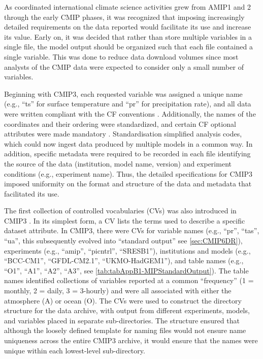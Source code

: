 \documentclass[manuscript]{copernicus}
\def\cred#1{{\color{red}#1}}
\begin{document}
As coordinated international climate science activities grew from AMIP1 and 2 through the early CMIP phases, it was recognized that imposing increasingly detailed requirements on the data reported would facilitate its use and increase its value. Early on, it was decided that rather than store multiple variables in a single file, the model output should be organized such that each file contained a single variable. This was done to reduce data download volumes since most analysts of the CMIP data were expected to consider only a small number of variables.

Beginning with CMIP3, each requested variable was assigned a unique name (e.g., “ts” for surface temperature and “pr” for precipitation rate), and all data were written compliant with the CF conventions \citep[e.g.,][]{taylor_pcmdi_2009}. Additionally, the names of the coordinates and their ordering were standardized, and certain CF optional attributes were made mandatory \citep[e.g., ``cell\_methods'';][]{eaton_netcdf_2024}. Standardisation simplified analysis codes, which could now ingest data produced by multiple models in a common way. In addition, specific metadata were required to be recorded in each file identifying the source of the data (institution, model name, version) and experiment conditions (e.g., experiment name). Thus, the detailed specifications for CMIP3 \citep[see][]{taylor_pcmdi_2005} imposed uniformity on the format and structure of the data and metadata that facilitated its use.

The first collection of controlled vocabularies (CVs) was also introduced in CMIP3 \citep[e.g.,][]{taylor_pcmdi_2005}. In its simplest form, a CV lists the terms used to describe a specific dataset attribute. In CMIP3, there were CVs for variable names (e.g., ``pr'', ``tas'', ``ua'', this subsequently evolved into ``standard output'' see \autoref{sec:CMIP6DR}), experiments (e.g., ``amip'', ``picntrl'', ``SRESB1''), institutions and models (e.g., ``BCC-CM1'', ``GFDL-CM2.1'', ``UKMO-HadGEM1''), and table names (e.g., ``O1'', ``A1'', ``A2'', ``A3'', see \autoref{tab:tabAppB1-MIPStandardOutput}). The table names identified collections of variables reported at a common ``frequency'' (1 = monthly, 2 = daily, 3 = 3-hourly) and were all associated with either the atmosphere (A) or ocean (O). The CVs were used to construct the directory structure for the data archive, with output from different experiments, models, and variables placed in separate sub-directories. The structure ensured that although the loosely defined template for naming files would not ensure name uniqueness across the entire CMIP3 archive, it would ensure that the names were unique within each lowest-level sub-directory.
\end{document}
